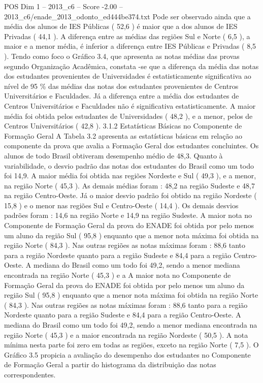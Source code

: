 \begin{textsample}{POS Dim 1 – 2013\_c6 – Score -2.00 – 2013\_c6/enade\_2013\_odonto\_ed444be374.txt}
Pode ser observado ainda que a média dos alunos de IES Públicas ( 52,6 ) é maior que a dos alunos de IES Privadas ( 44,1 ).
A diferença entre as médias das regiões Sul e Norte ( 6,5 ), a maior e a menor média, é inferior a diferença entre IES Públicas e Privadas ( 8,5 ).
Tendo como foco o Gráfico 3.4, que apresenta as notas médias das provas segundo Organização Acadêmica, constata -se que a diferença da média das notas dos estudantes provenientes de Universidades é estatisticamente significativa ao nível de 95 \% das médias das notas dos estudantes provenientes de Centros Universitários e Faculdades.
Já a diferença entre a média dos estudantes de Centros Universitários e Faculdades não é significativa estatisticamente.
A maior média foi obtida pelos estudantes de Universidades ( 48,2 ), e a menor, pelos de Centros Universitários ( 42,8 ). 3.1.2 Estatísticas Básicas no Componente de Formação Geral A Tabela 3.2 apresenta as estatísticas básicas em relação ao componente da prova que avalia a Formação Geral dos estudantes concluintes.
Os alunos de todo Brasil obtiveram desempenho médio de 48,3.
Quanto à variabilidade, o desvio padrão das notas dos estudantes do Brasil como um todo foi 14,9.
A maior média foi obtida nas regiões Nordeste e Sul ( 49,3 ), e a menor, na região Norte ( 45,3 ).
As demais médias foram : 48,2 na região Sudeste e 48,7 na região Centro-Oeste.
Já o maior desvio padrão foi obtido na região Nordeste ( 15,8 ) e o menor nas regiões Sul e Centro-Oeste ( 14,4 ).
Os demais desvios padrões foram : 14,6 na região Norte e 14,9 na região Sudeste.
A maior nota no Componente de Formação Geral da prova do ENADE foi obtida por pelo menos um aluno da região Sul ( 95,8 ) enquanto que a menor nota máxima foi obtida na região Norte ( 84,3 ).
Nas outras regiões as notas máximas foram : 88,6 tanto para a região Nordeste quanto para a região Sudeste e 84,4 para a região Centro-Oeste.
A mediana do Brasil como um todo foi 49,2, sendo a menor mediana encontrada na região Norte ( 45,3 ) e a A maior nota no Componente de Formação Geral da prova do ENADE foi obtida por pelo menos um aluno da região Sul ( 95,8 ) enquanto que a menor nota máxima foi obtida na região Norte ( 84,3 ).
Nas outras regiões as notas máximas foram : 88,6 tanto para a região Nordeste quanto para a região Sudeste e 84,4 para a região Centro-Oeste.
A mediana do Brasil como um todo foi 49,2, sendo a menor mediana encontrada na região Norte ( 45,3 ) e a maior encontrada na região Nordeste ( 50,5 ).
A nota mínima nesta parte foi zero em todas as regiões, exceto na região Norte ( 7,5 ).
O Gráfico 3.5 propicia a avaliação do desempenho dos estudantes no Componente de Formação Geral a partir do histograma da distribuição das notas correspondentes.

\end{textsample}
